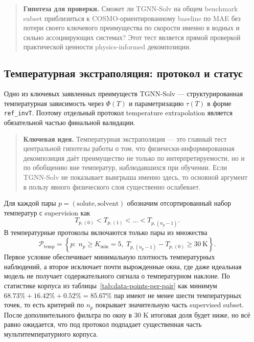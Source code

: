 \documentclass[11pt]{article}
\newcommand{\keyidea}[1]{\begin{quote}\textbf{Ключевая идея.} #1\end{quote}}
\newcommand{\openquestion}[1]{\begin{quote}\textbf{Гипотеза для проверки.} #1\end{quote}}
\begin{document}
\openquestion{Сможет ли TGNN-Solv на общем benchmark subset приблизиться к COSMO-ориентированному baseline по MAE без потери своего ключевого преимущества по скорости именно в водных и сильно ассоциирующих системах? Этот тест является прямой проверкой практической ценности physics-informed декомпозиции.}

\subsection{Температурная экстраполяция: протокол и статус}

Одно из ключевых заявленных преимуществ TGNN-Solv --- структурированная температурная зависимость через $\Phi(T)$ и параметризацию $\tau(T)$ в форме \texttt{ref\_invT}. Поэтому отдельный протокол temperature extrapolation является обязательной частью финальной валидации.

\keyidea{Температурная экстраполяция --- это главный тест центральной гипотезы работы о том, что физически-информированная декомпозиция даёт преимущество не только по интерпретируемости, но и по обобщению вне температур, наблюдавшихся при обучении. Если TGNN-Solv не показывает выигрыша именно здесь, то основной аргумент в пользу явного физического слоя существенно ослабевает.}

Для каждой пары $p=(\mathrm{solute},\mathrm{solvent})$ обозначим отсортированный набор температур с supervision как
\begin{equation*}
T_{p,(0)} < T_{p,(1)} < \dots < T_{p,(n_p-1)}.
\end{equation*}
В температурные протоколы включаются только пары из множества
\begin{equation*}
\mathcal{P}_{\mathrm{temp}} = \left\{p:\; n_p \geq K_{\min}=5,\; T_{p,(n_p-1)}-T_{p,(0)} \geq 30\ \mathrm{K}\right\}.
\end{equation*}
Первое условие обеспечивает минимальную плотность температурных наблюдений, а второе исключает почти вырожденные окна, где даже идеальная модель не получает содержательного сигнала о температурном наклоне. По статистике корпуса из таблицы~\ref{tab:data-points-per-pair} как минимум $68.73\%+16.42\%+0.52\%=85.67\%$ пар имеют не менее шести температурных точек, то есть критерий по $n_p$ покрывает значительную часть supervised subset. После дополнительного фильтра по окну в 30 K итоговая доля будет ниже, но всё равно ожидается, что под протокол подпадает существенная часть мультитемпературного корпуса.
\end{document}
